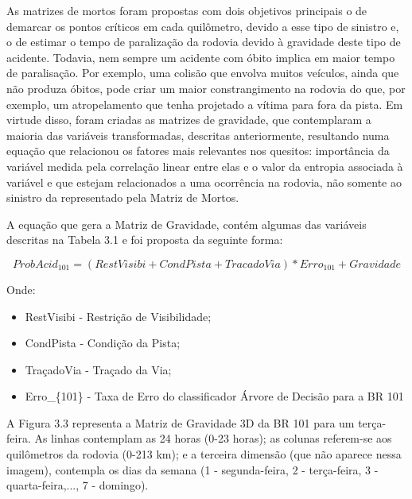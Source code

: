 
As matrizes de mortos foram propostas com dois objetivos principais o de demarcar os pontos  críticos em cada quilômetro, devido a esse tipo de sinistro e, o de estimar o tempo de paralização da rodovia devido à gravidade deste tipo de acidente. Todavia, nem sempre um acidente com óbito implica em maior tempo de paralisação. Por exemplo, uma colisão que envolva muitos veículos, ainda que não produza óbitos, pode criar um maior constrangimento na rodovia do que, por exemplo, um atropelamento que tenha projetado a vítima para fora da pista. Em virtude disso, foram criadas as matrizes de gravidade, que contemplaram a maioria das variáveis transformadas, descritas anteriormente, resultando numa equação que relacionou os fatores mais relevantes nos quesitos: importância da variável medida pela correlação linear entre elas e o valor da entropia associada à variável e que estejam relacionados a uma ocorrência na rodovia, não somente ao sinistro da representado pela Matriz de Mortos. 

\vspace{5mm}

A equação que gera a Matriz de Gravidade, contém algumas das variáveis descritas na Tabela 3.1 e foi proposta da seguinte forma: 

\begin{equation}
ProbAcid_{101} = (RestVisibi + CondPista + TracadoVia) *  Erro_{101} + Gravidade
\end{equation} 

Onde:

\begin{itemize}
	\item RestVisibi - Restrição de Visibilidade;
	\item CondPista  - Condição da Pista;
	\item TraçadoVia - Traçado da Via;
	\item Erro\_\{101\} - Taxa de Erro do classificador Árvore de Decisão para a BR 101
\end{itemize}
 
 \pagebreak
 
 A Figura 3.3 representa a Matriz de Gravidade 3D da BR 101 para um terça-feira. As linhas contemplam as 24 horas (0-23 horas); as colunas referem-se aos quilômetros da rodovia (0-213 km); e a terceira dimensão (que não aparece nessa imagem),  contempla os dias da semana (1 - segunda-feira, 2 - terça-feira, 3 - quarta-feira,..., 7 - domingo). 
 
